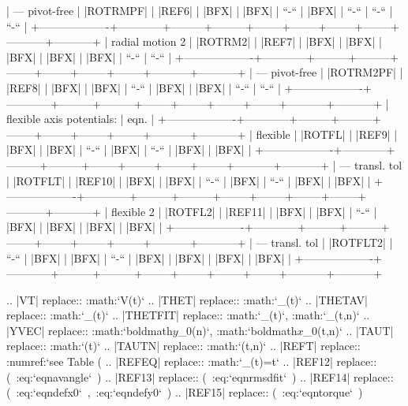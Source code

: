            | --- pivot-free    | |ROTRMPF|  | |REF6|  | |BFX|   | |BFX|  | ``-``  | |BFX|  | ``-``  | ``-``     | ``-``     |
           +-------------------+------------+---------+---------+--------+--------+--------+--------+-----------+-----------+
           | radial motion 2   | |ROTRM2|   | |REF7|  | |BFX|   | |BFX|  | |BFX|  | |BFX|  | |BFX|  | ``-``     | ``-``     |
           +-------------------+------------+---------+---------+--------+--------+--------+--------+-----------+-----------+
           | --- pivot-free    | |ROTRM2PF| | |REF8|  | |BFX|   | |BFX|  | ``-``  | |BFX|  | |BFX|  | ``-``     | ``-``     |
           +-------------------+------------+---------+---------+--------+--------+--------+--------+-----------+-----------+
           | flexible axis potentials:      | eqn.                                                                          | 
           +-------------------+------------+---------+---------+--------+--------+--------+--------+-----------+-----------+
           | flexible          | |ROTFL|    | |REF9|  | |BFX|   | |BFX|  | ``-``  | |BFX|  | ``-``  | |BFX|     | |BFX|     |
           +-------------------+------------+---------+---------+--------+--------+--------+--------+-----------+-----------+
           | --- transl. tol   | |ROTFLT|   | |REF10| | |BFX|   | |BFX|  | ``-``  | |BFX|  | ``-``  | |BFX|     | |BFX|     |
           +-------------------+------------+---------+---------+--------+--------+--------+--------+-----------+-----------+
           | flexible 2        | |ROTFL2|   | |REF11| | |BFX|   | |BFX|  | ``-``  | |BFX|  | |BFX|  | |BFX|     | |BFX|     |
           +-------------------+------------+---------+---------+--------+--------+--------+--------+-----------+-----------+
           | --- transl. tol   | |ROTFLT2|  | ``-``   | |BFX|   | |BFX|  | ``-``  | |BFX|  | |BFX|  | |BFX|     | |BFX|     |
           +-------------------+------------+---------+---------+--------+--------+--------+--------+-----------+-----------+


.. |VT|      replace:: :math:`V(t)`
.. |THET|    replace:: :math:`\theta_(t)`
.. |THETAV|  replace:: :math:`\theta_(t)`
.. |THETFIT| replace:: :math:`\theta_(t)`, :math:`\theta_(t,n)`
.. |YVEC|    replace:: :math:`{\mbox{boldmath{$y$}}}_{0}(n)`, :math:`{\mbox{boldmath{$x$}}}_{0}(t,n)`
.. |TAUT|    replace:: :math:`\tau(t)`
.. |TAUTN|   replace:: :math:`\tau(t,n)`
.. |REFT|  replace:: :numref:`see Table (%
.. |REFEQ| replace:: :math:`\theta_(t)=\omega t`
.. |REF12| replace:: (\ :eq:`eqnavangle`\ )               
.. |REF13| replace:: (\ :eq:`eqnrmsdfit`\ )               
.. |REF14| replace:: (\ :eq:`eqndefx0`\ ,\ :eq:`eqndefy0`\ )
.. |REF15| replace:: (\ :eq:`eqntorque`\ )                

